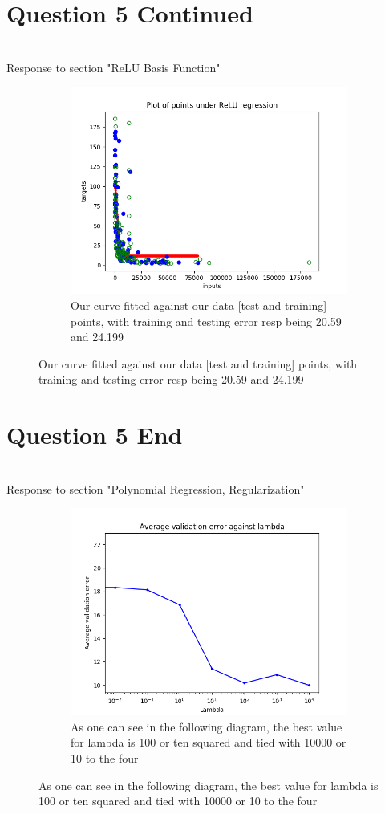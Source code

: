 \documentclass{article}
\begin{document}
\pagebreak
\section{Question 5 Continued}\label{sec:Question5Continued}

\\
Response to section "ReLU Basis Function"

\begin{figure}[h!]
	\centering
	\begin{subfigure}[b]{0.4\linewidth}
		\includegraphics[width=\linewidth]{ReLu.png}
		\caption{Our curve fitted against our data [test and training] points, with training and testing error resp being 20.59 and 24.199}
	\end{subfigure}
\end{figure}

\pagebreak
\section {Question 5 End} \label{sec:Question5End}

\\
Response to section "Polynomial Regression, Regularization"

\begin{figure}[h!]
	\centering
	\begin{subfigure}[b]{0.4\linewidth}
		\includegraphics[width=\linewidth]{VL.png}
		\caption{As one can see in the following diagram, the best value for lambda is 100 or ten squared and tied with 10000 or 10 to the four}
	\end{subfigure}
\end{figure}
\end{document}
